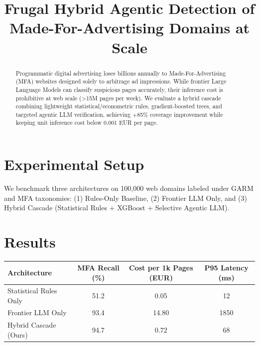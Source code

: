\documentclass{article}
\title{Frugal Hybrid Agentic Detection of Made-For-Advertising Domains at Scale}
\begin{document}
\maketitle

\begin{abstract}
Programmatic digital advertising loses billions annually to Made-For-Advertising (MFA) websites designed solely to arbitrage ad impressions. While frontier Large Language Models can classify suspicious pages accurately, their inference cost is prohibitive at web scale (>15M pages per week). We evaluate a hybrid cascade combining lightweight statistical/econometric rules, gradient-boosted trees, and targeted agentic LLM verification, achieving +85\% coverage improvement while keeping unit inference cost below 0.001 EUR per page.
\end{abstract}

\section{Experimental Setup}
We benchmark three architectures on 100,000 web domains labeled under GARM and MFA taxonomies: (1) Rules-Only Baseline, (2) Frontier LLM Only, and (3) Hybrid Cascade (Statistical Rules + XGBoost + Selective Agentic LLM).

\section{Results}
\begin{tabular}{lccc}
\toprule
Architecture & MFA Recall (\%) & Cost per 1k Pages (EUR) & P95 Latency (ms) \\
\midrule
Statistical Rules Only & 51.2 & 0.05 & 12 \\
Frontier LLM Only & 93.4 & 14.80 & 1850 \\
Hybrid Cascade (Ours) & 94.7 & 0.72 & 68 \\
\bottomrule
\end{tabular}
\end{document}

